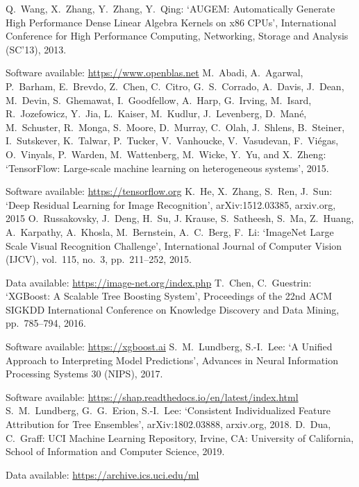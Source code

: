 \begin{thebibliography}{99}
%
Q.\ Wang, X.\ Zhang, Y.\ Zhang, Y.\ Qing: `AUGEM: Automatically Generate High Performance Dense Linear Algebra Kernels on x86 CPUs', International Conference for High Performance Computing, Networking, Storage and Analysis (SC'13), 2013.\par
%
Software available: \url{https://www.openblas.net}
%
M.\ Abadi, A.\ Agarwal, P.\ Barham, E.\ Brevdo, Z.\ Chen, C.\ Citro, G.\ S.\ Corrado, A.\ Davis, J.\ Dean, M.\ Devin, S.\ Ghemawat, I.\ Goodfellow, A.\ Harp, G.\ Irving, M.\ Isard, R.\ Jozefowicz, Y.\ Jia, L.\ Kaiser, M.\ Kudlur, J.\ Levenberg, D.\ Mané, M.\ Schuster, R.\ Monga, S.\ Moore, D.\ Murray, C.\ Olah, J.\ Shlens, B.\ Steiner, I.\ Sutskever, K.\ Talwar, P.\ Tucker, V.\ Vanhoucke, V.\ Vasudevan, F.\ Viégas, O.\ Vinyals, P.\ Warden, M.\ Wattenberg, M.\ Wicke, Y.\ Yu, and X.\ Zheng: `TensorFlow: Large-scale machine learning on heterogeneous systems', 2015.\par
%
Software available: \url{https://tensorflow.org}
%
K.\ He, X.\ Zhang, S.\ Ren, J.\ Sun: `Deep Residual Learning for Image Recognition', arXiv:1512.03385, arxiv.org, 2015
%
O.\ Russakovsky, J.\ Deng, H.\ Su, J. Krause, S.\ Satheesh, S.\ Ma, Z.\ Huang, A.\ Karpathy, A.\ Khosla, M.\ Bernstein, A.\ C.\ Berg, F.\ Li: `ImageNet Large Scale Visual Recognition Challenge', International Journal of Computer Vision (IJCV), vol.\ 115, no.\ 3, pp.\ 211--252, 2015.\par
%
Data available: \url{https://image-net.org/index.php}
%
T.\ Chen, C.\ Guestrin: `XGBoost: A Scalable Tree Boosting System', Proceedings of the 22nd ACM SIGKDD International Conference on Knowledge Discovery and Data Mining, pp.\ 785--794, 2016.\par
%
Software available: \url{https://xgboost.ai}
%
S.\ M.\ Lundberg, S.-I.\ Lee: `A Unified Approach to Interpreting Model Predictions', Advances in Neural Information Processing Systems 30 (NIPS), 2017.\par
%
Software available: \url{https://shap.readthedocs.io/en/latest/index.html}
%
S.\ M.\ Lundberg, G.\ G.\ Erion, S.-I.\ Lee: `Consistent Individualized Feature Attribution for Tree Ensembles', arXiv:1802.03888, arxiv.org, 2018.
%
D.\ Dua, C.\ Graff: UCI Machine Learning Repository, Irvine, CA: University of California, School of Information and Computer Science, 2019.\par
%
Data available: \url{https://archive.ics.uci.edu/ml}

\end{thebibliography}
